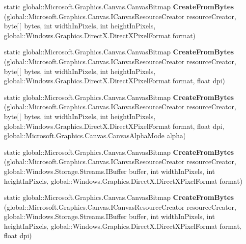 \begin{DoxyCompactItemize}
static global\+::\+Microsoft.\+Graphics.\+Canvas.\+Canvas\+Bitmap {\bfseries Create\+From\+Bytes} (global\+::\+Microsoft.\+Graphics.\+Canvas.\+I\+Canvas\+Resource\+Creator resource\+Creator, byte\mbox{[}$\,$\mbox{]} bytes, int width\+In\+Pixels, int height\+In\+Pixels, global\+::\+Windows.\+Graphics.\+Direct\+X.\+Direct\+X\+Pixel\+Format format)
\item 
\mbox{\label{class_microsoft_1_1_graphics_1_1_canvas_1_1_canvas_bitmap_a34eb9feffadf35700e66c251dd67d5fc}} 
static global\+::\+Microsoft.\+Graphics.\+Canvas.\+Canvas\+Bitmap {\bfseries Create\+From\+Bytes} (global\+::\+Microsoft.\+Graphics.\+Canvas.\+I\+Canvas\+Resource\+Creator resource\+Creator, byte\mbox{[}$\,$\mbox{]} bytes, int width\+In\+Pixels, int height\+In\+Pixels, global\+::\+Windows.\+Graphics.\+Direct\+X.\+Direct\+X\+Pixel\+Format format, float dpi)
\item 
\mbox{\label{class_microsoft_1_1_graphics_1_1_canvas_1_1_canvas_bitmap_a9681e1d684ee6e674d7512d2874c8f1b}} 
static global\+::\+Microsoft.\+Graphics.\+Canvas.\+Canvas\+Bitmap {\bfseries Create\+From\+Bytes} (global\+::\+Microsoft.\+Graphics.\+Canvas.\+I\+Canvas\+Resource\+Creator resource\+Creator, byte\mbox{[}$\,$\mbox{]} bytes, int width\+In\+Pixels, int height\+In\+Pixels, global\+::\+Windows.\+Graphics.\+Direct\+X.\+Direct\+X\+Pixel\+Format format, float dpi, global\+::\+Microsoft.\+Graphics.\+Canvas.\+Canvas\+Alpha\+Mode alpha)
\item 
\mbox{\label{class_microsoft_1_1_graphics_1_1_canvas_1_1_canvas_bitmap_a2168a3d89e47f661342d1550456b8f68}} 
static global\+::\+Microsoft.\+Graphics.\+Canvas.\+Canvas\+Bitmap {\bfseries Create\+From\+Bytes} (global\+::\+Microsoft.\+Graphics.\+Canvas.\+I\+Canvas\+Resource\+Creator resource\+Creator, global\+::\+Windows.\+Storage.\+Streams.\+I\+Buffer buffer, int width\+In\+Pixels, int height\+In\+Pixels, global\+::\+Windows.\+Graphics.\+Direct\+X.\+Direct\+X\+Pixel\+Format format)
\item 
\mbox{\label{class_microsoft_1_1_graphics_1_1_canvas_1_1_canvas_bitmap_af1daa19ada592de34b02ac1e97e88606}} 
static global\+::\+Microsoft.\+Graphics.\+Canvas.\+Canvas\+Bitmap {\bfseries Create\+From\+Bytes} (global\+::\+Microsoft.\+Graphics.\+Canvas.\+I\+Canvas\+Resource\+Creator resource\+Creator, global\+::\+Windows.\+Storage.\+Streams.\+I\+Buffer buffer, int width\+In\+Pixels, int height\+In\+Pixels, global\+::\+Windows.\+Graphics.\+Direct\+X.\+Direct\+X\+Pixel\+Format format, float dpi)

\end{DoxyCompactItemize}
